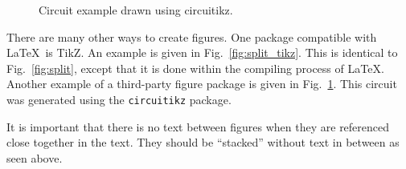 \begin{figure}[!t]
	\begin{center}
		\caption{Circuit example drawn using circuitikz.}
		\label{fig:circuitikz_exmple}
	\end{center}
\end{figure}

There are many other ways to create figures.  One package compatible
with \LaTeX\ is TikZ.  An example is given in
Fig.~\ref{fig:split_tikz}. This is identical to Fig.~\ref{fig:split},
except that it is done within the compiling process of \LaTeX.
Another example of a third-party figure package is given in
Fig.~\ref{fig:circuitikz_exmple}.  This circuit was generated using
the {\tt circuitikz} package.

It is important that there is no text between figures when they are
referenced close together in the text.  They should be ``stacked''
without text in between as seen above.

